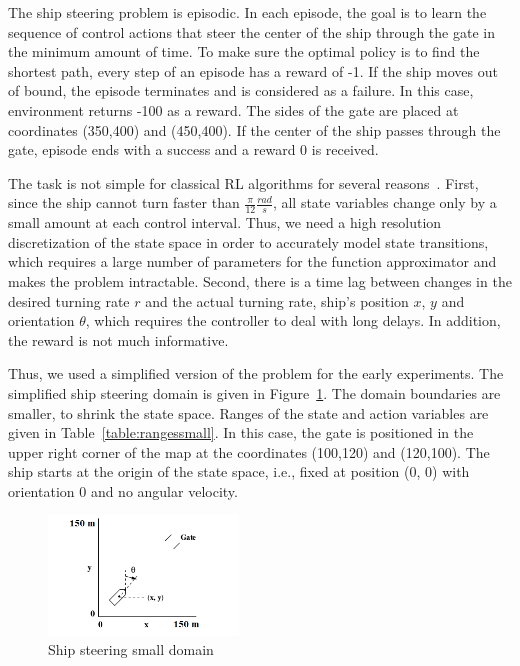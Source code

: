The ship steering problem is episodic. In each episode, the goal is to learn the sequence of control actions that steer the center of the ship through the gate in the minimum amount of time. To make sure the optimal policy is to find the shortest path, every step of an episode has a reward of -1. If the ship moves out of bound, the episode terminates and is considered as a failure. In this case, environment returns -100 as a reward. The sides of the gate are placed at coordinates (350,400) and (450,400). If the center of the ship passes through the gate, episode ends with a success and a reward 0 is received. 

The task is not simple for classical RL algorithms for several reasons~\cite{GhavamzadehHierarchicalPG}. First, since the ship cannot turn faster than $\frac{\pi}{12} \frac{rad}{s}$, all state variables change only by a small amount at each control interval. Thus, we need a high resolution discretization of the state space in order to accurately model state transitions, which requires a large number of parameters for the function approximator and makes the problem intractable. Second, there is a time lag between changes in the desired turning rate $r$ and the actual turning rate, ship’s position $x$, $y$ and orientation $\theta$, which requires the controller to deal with long delays. In addition, the reward is not much informative. 

Thus, we used a simplified version of the problem for the early experiments. The simplified ship steering domain is given in Figure~\ref{fig:shipsteeringdomain}. The domain boundaries are smaller, to shrink the state space. Ranges of the state and action variables are given in Table~\ref{table:rangessmall}. In this case, the gate is positioned in the upper right corner of the map at the coordinates (100,120) and (120,100). The ship starts at the origin of the state space, i.e., fixed at position (0, 0) with orientation 0 and no angular velocity.   
\begin{figure}[t]
      \centering
      \includegraphics[width = 0.45\textwidth]{./pictures/shipsteeringdomain.png}
      \caption{Ship steering small domain}
      \label{fig:shipsteeringdomain}
\end{figure}

